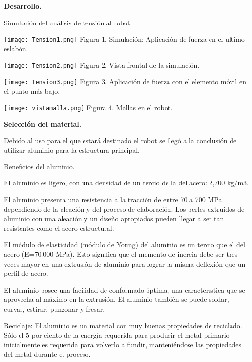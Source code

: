 \documentclass[a4paper,10pt]{article}
\begin{document}
\hfill

\textbf{Desarrollo.}

\hfill

Simulación del análisis de tensión al robot.

\begin{center}
\texttt{[image: Tension1.png]}
Figura 1. Simulación: Aplicación de fuerza en el ultimo eslabón.
\end{center}

\begin{center}
\texttt{[image: Tension2.png]}
Figura 2. Vista frontal de la simulación.
\end{center}

\begin{center}
\texttt{[image: Tension3.png]}
Figura 3. Aplicación de fuerza con el elemento móvil en el punto más bajo.
\end{center}

\begin{center}
\texttt{[image: vistamalla.png]}
Figura 4. Mallas en el robot.
\end{center}

\break

\textbf{Selección del material.}

\hfill

Debido al uso para el que estará destinado el robot se llegó a la conclusión de utilizar aluminio para la estructura principal.

Beneficios del aluminio.

El aluminio es ligero, con una densidad de un tercio de la del acero: 2,700 kg/m3. 

El aluminio presenta una resistencia a la tracción de entre 70 a 700 MPa dependiendo de la aleación y del proceso de elaboración. Los perles extruidos de aluminio con una aleación y un diseño apropiados pueden llegar a ser tan resistentes como el acero estructural.

El módulo de elasticidad (módulo de Young) del aluminio es un tercio que el del acero (E=70.000 MPa). Esto significa que el momento de inercia debe ser tres veces mayor en una extrusión de aluminio para lograr la misma deflexión que un perfil de acero.

El aluminio posee una facilidad de conformado óptima, una característica que se aprovecha al máximo en la extrusión. El aluminio también se puede soldar, curvar, estirar, punzonar y fresar.

Reciclaje: El aluminio es un material con muy buenas propiedades de reciclado. Sólo el 5 por ciento de la energía requerida para producir el metal primario inicialmente es requerida para volverlo a fundir, manteniéndose las propiedades del metal durante el proceso.
\end{document}
